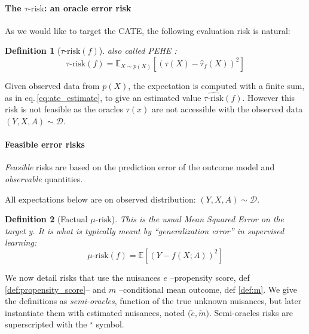 \documentclass[french,12pt,twoside,a4paper]{book}
\newtheorem{definition}{Definition}
\begin{document}
\paragraph{The $\tau\text{-risk}$: an oracle error risk}\label{paragraph:oracle_metrics}
%
As we would like to target the CATE, the following
evaluation risk is natural:
\begin{definition}[$\tau\text{-risk}(f)$]\label{def:tau_risk} also called PEHE
  \citep{schulam_reliable_2017, hill_bayesian_2011}:
  \begin{equation*}\label{eq:tau_risk}
    \tau\text{-risk}(f) = \mathbb E_{X\sim p(X)}[(\tau(X) - \hat \tau_f(X))^2]
  \end{equation*}
\end{definition}

Given observed data from $p(X)$, the expectation is computed with a
finite sum, as in eq.\,\ref{eq:ate_estimate}, to give an estimated
value $\widehat{\tau\text{-risk}}(f)$.
%
However this risk is not feasible as the oracles $\tau(x)$ are
not accessible with the observed data $(Y, X, A) \sim \mathcal D$.

\paragraph{Feasible error risks}\label{paragraph:feasible_metrics}
\emph{Feasible} risks are based on the prediction error of the outcome model
and \emph{observable} quantities.

All expectations below are on observed distribution:
$(Y, X, A) \sim \mathcal D$.

\begin{definition}[Factual $\mu\text{-risk}$]\label{def:mu_risk}
  \citep{shalit_estimating_2017} This is the usual Mean Squared Error on
  the target y. It is what is typically meant by ``generalization error'' in
  supervised learning:
  \begin{equation*}\label{eq:mu_risk}
    \mu\text{-risk}(f)=\mathbb{E}\left[(Y-f(X ; A))^2 \right]
  \end{equation*}
\end{definition}

We now detail risks that use the nuisances $e$
--propensity score, def \ref{def:propensity_score}-- and $m$ --conditional mean
outcome, def \ref{def:m}. We give the definitions as \textit{semi-oracles},
function of the true unknown nuisances, but later instantiate them with estimated
nuisances, noted $\big(\check e, \check m \big)$. Semi-oracles risks are
superscripted with the $^{\star}$ symbol.
\end{document}
